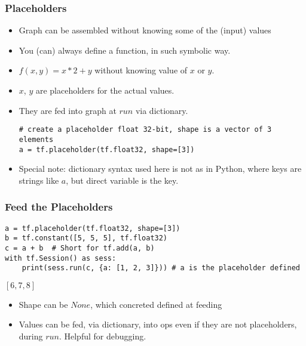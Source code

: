 \begin{frame}[fragile] \frametitle{Placeholders}
\begin{itemize}
\item Graph can be assembled without knowing some of the (input) values
\item You (can) always define a function, in such symbolic way.
\item $f(x, y) = x*2 + y$ without knowing value of $x$ or $y$. 
\item $x$, $y$ are placeholders for the actual values.
\item They are fed into graph at $run$ via dictionary.
\begin{lstlisting}
# create a placeholder float 32-bit, shape is a vector of 3 elements
a = tf.placeholder(tf.float32, shape=[3])
\end{lstlisting}
\item Special note: dictionary syntax used here is not as in Python, where keys are strings like $a$, but direct variable is the key.
\end{itemize}

\end{frame}

\begin{frame}[fragile] \frametitle{Feed the Placeholders}
\begin{lstlisting}
a = tf.placeholder(tf.float32, shape=[3])
b = tf.constant([5, 5, 5], tf.float32)
c = a + b  # Short for tf.add(a, b)
with tf.Session() as sess:
	print(sess.run(c, {a: [1, 2, 3]})) # a is the placeholder defined
\end{lstlisting}
$ [6, 7, 8]$
\begin{itemize}
\item Shape can be $None$, which concreted defined at feeding
\item Values can be fed, via dictionary, into ops even if they are not placeholders, during $run$. Helpful for debugging.
\end{itemize}

\end{frame}


